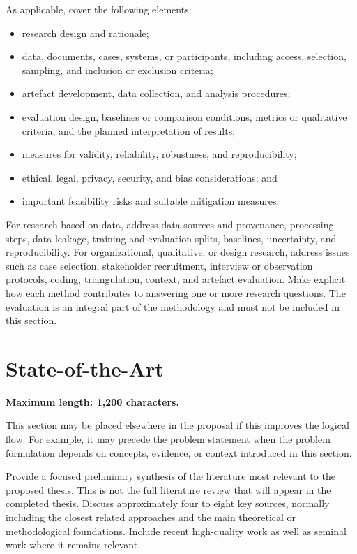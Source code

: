 \documentclass[runningheads]{llncs}
\begin{document}
As applicable, cover the following elements:
\begin{itemize}
  \item research design and rationale;
  \item data, documents, cases, systems, or participants, including access,
        selection, sampling, and inclusion or exclusion criteria;
  \item artefact development, data collection, and analysis procedures;
  \item evaluation design, baselines or comparison conditions, metrics or
        qualitative criteria, and the planned interpretation of results;
  \item measures for validity, reliability, robustness, and reproducibility;
  \item ethical, legal, privacy, security, and bias considerations; and
  \item important feasibility risks and suitable mitigation measures.
\end{itemize}

For research based on data, address data sources and provenance, processing
steps, data leakage, training and evaluation splits, baselines, uncertainty,
and reproducibility. For organizational, qualitative, or design research,
address issues such as case selection, stakeholder
recruitment, interview or observation protocols, coding, triangulation,
context, and artefact evaluation. Make explicit how each method contributes to
answering one or more research questions. The evaluation is an integral part
of the methodology and must not be included in this section.

\section{State-of-the-Art}
\textbf{Maximum length: 1,200 characters.}

This section may be placed elsewhere in the proposal if this improves the logical flow. For example, it may precede the problem statement when the problem formulation depends on concepts, evidence, or context introduced in this section.

Provide a focused preliminary synthesis of the literature most relevant to the
proposed thesis. This is not the full literature review that will appear in the
completed thesis. Discuss approximately four to eight key sources, normally
including the closest related approaches and the main theoretical or
methodological foundations. Include recent high-quality work as well as
seminal work where it remains relevant.
\end{document}
